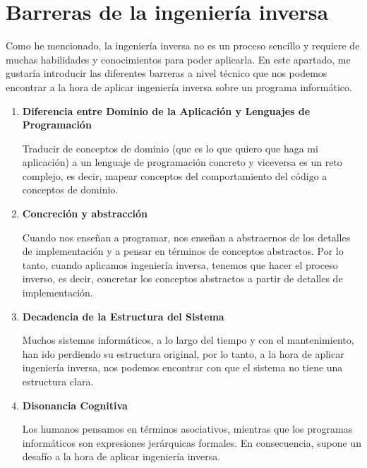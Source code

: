 \section{Barreras de la ingeniería inversa}
\label{sec:barreras}


Como he mencionado, la ingeniería inversa no es un proceso sencillo y requiere de muchas
habilidades y conocimientos para poder aplicarla. En este apartado, me gustaría introducir
las diferentes barreras a nivel técnico que nos podemos encontrar a la hora de aplicar
ingeniería inversa sobre un programa informático. \cite{alma991004951313206711}

\begin{enumerate}
    \item \textbf{Diferencia entre Dominio de la Aplicación y Lenguajes de Programación}
        
        Traducir de conceptos de dominio (que es lo que quiero que haga mi aplicación) a
        un lenguaje de programación concreto y viceversa es un reto complejo, es decir, mapear
        conceptos del comportamiento del código a conceptos de dominio.
    \item \textbf{Concreción y abstracción}
        
        Cuando nos enseñan a programar, nos enseñan a abstraernos de los detalles de implementación
        y a pensar en términos de conceptos abstractos. Por lo tanto, cuando aplicamos ingeniería
        inversa, tenemos que hacer el proceso inverso, es decir, concretar los conceptos abstractos
        a partir de detalles de implementación.
    \item \textbf{Decadencia de la Estructura del Sistema}
        
        Muchos sistemas informáticos, a lo largo del tiempo y con el mantenimiento, han ido perdiendo
        su estructura original, por lo tanto, a la hora de aplicar ingeniería inversa, nos podemos
        encontrar con que el sistema no tiene una estructura clara.
    \item \textbf{Disonancia Cognitiva}
        
        Los humanos pensamos en términos asociativos, mientras que los programas informáticos son expresiones
        jerárquicas formales. En consecuencia, supone un desafío a la hora de aplicar ingeniería inversa.
\end{enumerate}

